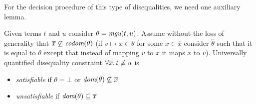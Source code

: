 For the decision procedure of this type of disequalities,
we need one auxiliary lemma.

\begin{lemma}
  Given terms $t$ and $u$ consider $\theta = \textit{mgu}(t, u)$.
  Assume without the loss of generality that 
  $\overline{x} \not\subseteq \textit{codom}{({\theta})}$
  (if $v \mapsto x \in \theta$ for some $x \in \overline{x}$
   consider $\hat{\theta}$ such that it is equal to $\theta$
   except that instead of mapping $v$ to $x$
   it maps $x$ to $v$).
  Universally quantified disequality constraint 
  $\forall \overline{x}\ldotp t \not\equiv u$ is
  \begin{itemize}
    \item \emph{satisfiable} if
          $\theta = \bot$ or $\textit{dom}{({\theta})} \not\subseteq \overline{x}$ 
    \item \emph{unsatisfiable} if
          $\textit{dom}{({\theta})} \subseteq \overline{x}$ 
  \end{itemize}
\end{lemma}

